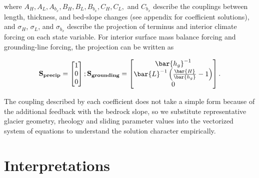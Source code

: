 \documentclass[tc, manuscript]{copernicus}
\begin{document}
where $A_H, A_L, A_{b_x}, B_H, B_L, B_{b_x}, C_H, C_L,$ and $C_{b_x}$ describe the couplings between length, thickness, and bed-slope changes (see appendix for coefficient solutions), and $\sigma_H$, $\sigma_L$, and $\sigma_{b_x}$ describe the projection of terminus and interior climate forcing on each state variable. For interior surface mass balance forcing and grounding-line forcing, the projection can be written as

\begin{align}
\bf{S}_{precip} =   \begin{bmatrix} 1 \\ 0 \\ 0 \end{bmatrix}; \space
\bf{S}_{grounding} =   \begin{bmatrix} \bar{h_g}^{-1} \\ \bar{L}^{-1}\left(\frac{\bar{H}}{\bar{h_g}}-1\right) \\ 0 \end{bmatrix}.
\end{align}


The coupling described by each coefficient does not take a simple form because of the additional feedback with the bedrock slope, so we substitute representative glacier geometry, rheology and sliding parameter values into the vectorized system of equations to understand the solution character empirically. 


\section{Interpretations}
\end{document}
